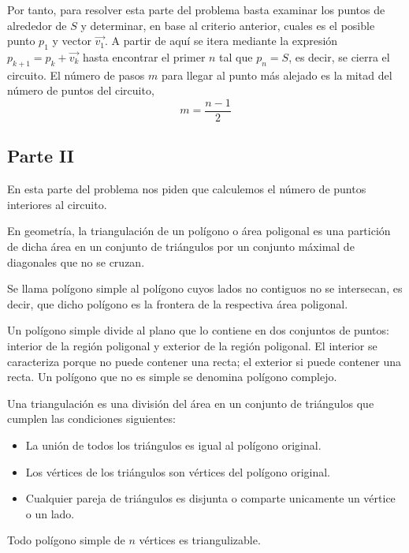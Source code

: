 \documentclass[a4paper,12pt]{article}
\begin{document}
Por tanto, para resolver esta parte del problema basta examinar los puntos de alrededor de $S$ y determinar, en base al criterio anterior, cuales es el posible punto $p_1$ y vector $\vec{v_1}$. A partir de aquí se itera mediante la expresión $p_{k+1}=p_{k}+\vec{v_k}$ hasta encontrar el primer $n$ tal que $p_n=S$, es decir, se cierra el circuito. El número de pasos $m$ para llegar al punto más alejado es la mitad del número de puntos del circuito,
$$m=\frac{n-1}{2}$$

\subsection{Parte II}

En esta parte del problema nos piden que calculemos el número de puntos interiores al circuito. 

En geometría, la triangulación de un polígono o área poligonal es una partición de dicha área en un conjunto de triángulos por un conjunto máximal de diagonales que no se cruzan.

\begin{df}
    Se llama polígono simple al polígono cuyos lados no contiguos no se intersecan, es decir, que dicho polígono es la frontera de la respectiva área poligonal. 
\end{df}

Un polígono simple divide al plano que lo contiene en dos conjuntos de puntos: interior de la región poligonal y exterior de la región poligonal. El interior se caracteriza porque no puede contener una recta; el exterior si puede contener una recta. Un polígono que no es simple se denomina polígono complejo.

\begin{df}
    Una triangulación es una división del área en un conjunto de triángulos que cumplen las condiciones siguientes:
    \begin{itemize}
        \item La unión de todos los triángulos es igual al polígono original.
        \item Los vértices de los triángulos son vértices del polígono original.
        \item Cualquier pareja de triángulos es disjunta o comparte unicamente un vértice o un lado.
    \end{itemize}
\end{df}

\begin{lem}
    Todo polígono simple de $n$ vértices es triangulizable.
\end{lem}
\end{document}
